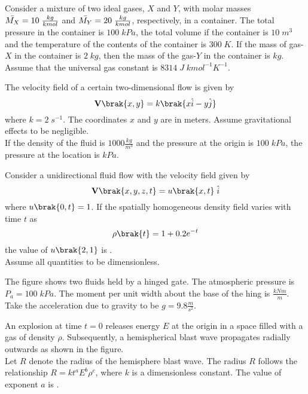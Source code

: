 \item Consider a mixture of two ideal gases, $X$ and $Y$, with molar masses $\Bar{M_X}=10\;\frac{kg}{kmol}$ and $\Bar{M_Y}=20\;\frac{kg}{kmol}$, respectively, in a container. The total pressure in the container is $100\;kPa$, the total volume if the container is $10\;m^3$ and the temperature of the contents of the container is $300\;K$. If the mass of gas-$X$ in the container is $2\;kg$, then the mass of the gas-$Y$ in the container is \underline{\hspace{2cm}}$kg$.\\ Assume that the universal gas constant is $8314\;J\;kmol^{-1}K^{-1}$.
\item The velocity field of a certain two-dimensional flow is given by $$\textbf{V}\brak{x,y}=k\brak{x\hat{i}-y\hat{j}}$$ where $k=2\;s^{-1}$. The coordinates $x$ and $y$ are in meters. Assume gravitational effects to be negligible.\\If the density of the fluid is $1000\frac{kg}{m^3}$ and the pressure at the origin is $100\;kPa$, the pressure at the location  is \underline{\hspace{2cm}} $kPa$.\\ 
\item Consider a unidirectional fluid flow with the velocity field given by $$\textbf{V}\brak{x,y,z,t}=u\brak{x,t}\;\hat{i}$$ where $u\brak{0,t}=1$. If the spatially homogeneous density field varies with time $t$ as $$\rho\brak{t}=1+0.2e^{-t}$$ the value of $u\brak{2,1}$ is \underline{\hspace{2cm}}.\\ Assume all quantities to be dimensionless. 
\item The figure shows two fluids held by a hinged gate. The atmospheric pressure is $P_a=100\;kPa$. The moment per unit width about the base of the hing is \underline{\hspace{2cm}} $\frac{kNm}{m}$.\\ Take the acceleration due to gravity to be $g=9.8\frac{m}{s^2}$.

\item An explosion at time $t=0$ releases energy $E$ at the origin in a space filled with a gas of density $\rho$. Subsequently, a hemispherical blast wave propagates radially outwards as shown in the figure.\\ Let $R$ denote the radius of the hemisphere blast wave. The radius $R$ follows the relationship $R=kt^aE^b\rho^c$, where $k$ is a dimensionless constant. The value of exponent $a$ is \underline{\hspace{2cm}}.\\ \\


